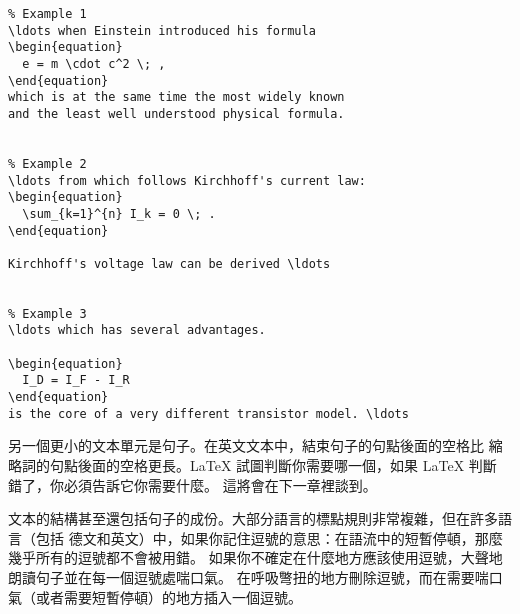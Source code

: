 \begin{code}
\begin{verbatim}
% Example 1
\ldots when Einstein introduced his formula
\begin{equation}
  e = m \cdot c^2 \; ,
\end{equation}
which is at the same time the most widely known
and the least well understood physical formula.


% Example 2
\ldots from which follows Kirchhoff's current law:
\begin{equation}
  \sum_{k=1}^{n} I_k = 0 \; .
\end{equation}

Kirchhoff's voltage law can be derived \ldots


% Example 3
\ldots which has several advantages.

\begin{equation}
  I_D = I_F - I_R
\end{equation}
is the core of a very different transistor model. \ldots
\end{verbatim}
\end{code}

另一個更小的文本單元是句子。在英文文本中，結束句子的句點後面的空格比
縮略詞的句點後面的空格更長。\LaTeX{} 試圖判斷你需要哪一個，如果 \LaTeX{} 判斷
錯了，你必須告訴它你需要什麼。 這將會在下一章裡談到。

文本的結構甚至還包括句子的成份。大部分語言的標點規則非常複雜，但在許多語言（包括
德文和英文）中，如果你記住逗號的意思：在語流中的短暫停頓，那麼幾乎所有的逗號都不會被用錯。
如果你不確定在什麼地方應該使用逗號，大聲地朗讀句子並在每一個逗號處喘口氣。
在呼吸彆扭的地方刪除逗號，而在需要喘口氣（或者需要短暫停頓）的地方插入一個逗號。

